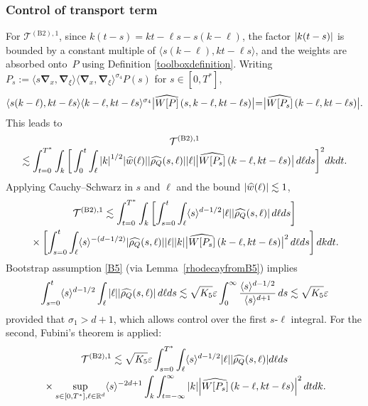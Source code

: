 \documentclass[JEP,XML,SOM,Unicode]{cedram}
\newcommand{\babs}[1]{\bigl|#1\bigr|}
\theoremstyle{plain}
\theoremstyle{remark}
\newcommand{\br}[1]{\left(#1\right)}
\newcommand{\ak}{\abs{k}}
\newcommand{\sbr}[1]{\left[#1\right]}
\newcommand{\jb}[1]{\langle#1\rangle}
\newcommand{\ep}{\varepsilon}
\newcommand{\R}{\mathbb{R}}
\begin{document}
\subsubsection{Control of transport term}\label{controloftransportB2original}
For $\mathcal{T}^{\mathrm{(B2),1}}$, since $k(t-s)=kt-\ell s-s(k-\ell)$, the factor $\abs{k(t-s)}$ is bounded by a constant multiple of $\jb{s(k-\ell),kt-\ell s}$, and the weights are absorbed onto~$P$ using Definition \ref{toolboxdefinition}. Writing $P_s:=\jb{s\bm{\nabla}_x,\bm{\nabla}_\xi}\jb{\bm{\nabla}_x,\bm{\nabla}_\xi}^{\sigma_4}P(s)$ for $s\in[0,T^*]$,
\begin{align*}
\jb{s(k-\ell),kt-\ell s}\jb{k-\ell,kt-\ell s}^{\sigma_4}\babs{\widehat {W[P]}\br{s,k-\ell,kt-\ell s}}\hspace{-0.08cm}=\hspace{-0.08cm}\babs{\widehat{W[P_s]}\br{k-\ell,kt-\ell s}}.
\end{align*}
This leads to
\begin{multline}\label{TforB2original}
\mathcal{T}^{\mathrm{(B2),1}}\\[-5pt]
\lesssim\int_{t=0}^{T^*}\int_k\bigg[\int_0^t\int_\ell\ak^{1/2}\abs{\widehat w(\ell)}\abs{\widehat{\rho_Q}(s,\ell)} \abs{\ell}\babs{\widehat{W[P_s]}\br{k-\ell,kt-\ell s}}\,d\ell ds\bigg]^2dkdt.
\end{multline}
Applying Cauchy--Schwarz in $s$ and $\ell$ and the bound $\abs{\widehat w(\ell)}\lesssim1$,
\begin{multline*}
\mathcal{T}^{\mathrm{(B2),1}}\lesssim\int_{t=0}^{T^*}\int_k\sbr{\int_{s=0}^t\int_\ell\jb{s}^{d-1/2}\abs{\ell}\abs{\widehat{\rho_Q}(s,\ell)}\,d\ell ds}\\
{}\times\sbr{\int_{s=0}^t\int_\ell\jb{s}^{-(d-1/2)}\abs{\widehat{\rho_Q}(s,\ell)} \abs{\ell}\ak\babs{\widehat{W[P_s]}\br{k-\ell,kt-\ell s}}^2\,d\ell ds}dkdt.
\end{multline*}
Bootstrap assumption \eqref{B5} (via Lemma~\ref{rhodecayfromB5}) implies
\begin{align*}
\int_{s=0}^t\jb{s}^{d-1/2}\int_\ell\abs{\ell}\abs{\widehat{\rho_Q}(s,\ell)}\,d\ell ds\lesssim\sqrt{K_5}\ep\int_0^\infty\frac{\jb{s}^{d-1/2}}{\jb{s}^{d+1}}\,ds\lesssim\sqrt{K_5}\ep
\end{align*}provided that $\sigma_1>d+1$, which allows control over the first $s$-$\ell$ integral. For the second, Fubini's theorem is applied:
\begin{multline*}
\mathcal{T}^{\mathrm{(B2),1}}\lesssim\sqrt{K_5}\ep\int_{s=0}^{T^*} \int_\ell \jb{s}^{d-1/2}\abs{\ell}\abs{\widehat{\rho_Q}(s,\ell)} d\ell ds\\
{}\times\sup_{s\in[0,T^*],\ell\in\R^d}\jb{s}^{-2d+1}\int_k\int_{t=-\infty}^\infty\ak\abs{\widehat{W[P_s]}\br{k-\ell,kt-\ell s}}^2\,dtdk.
\end{multline*}
\end{document}
